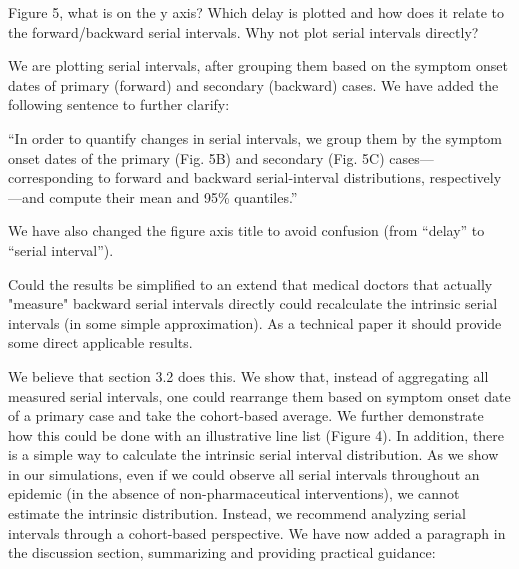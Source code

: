 \documentclass[12pt]{article}
\newcommand{\revtext}{\textsf}
\begin{document}
\revtext{Figure 5, what is on the y axis? Which delay is plotted and how does it relate to the forward/backward serial intervals. Why not plot serial intervals directly?}

We are plotting serial intervals, after grouping them based on the symptom onset dates of primary (forward) and secondary (backward) cases. We have added the following sentence to further clarify:

``In order to quantify changes in serial intervals, we group them by the symptom onset dates of the primary (Fig. 5B) and secondary (Fig. 5C) cases---corresponding to forward and backward serial-interval distributions, respectively---and compute their mean and 95\% quantiles.''

We have also changed the figure axis title to avoid confusion (from ``delay'' to ``serial interval'').

\revtext{Could the results be simplified to an extend that medical doctors that actually "measure" backward serial intervals directly could recalculate the intrinsic serial intervals (in some simple approximation). As a technical paper it should provide some direct applicable results.}

We believe that section 3.2 does this. We show that, instead of aggregating all measured serial intervals, one could rearrange them based on symptom onset date of a primary case and take the cohort-based average. We further demonstrate how this could be done with an illustrative line list (Figure 4). In addition, there is a simple way to calculate the intrinsic serial interval distribution. As we show in our simulations, even if we could observe all serial intervals throughout an epidemic (in the absence of non-pharmaceutical interventions), we cannot estimate the intrinsic distribution. Instead, we recommend analyzing serial intervals through a cohort-based perspective. We have now added a paragraph in the discussion section, summarizing and providing practical guidance:
\end{document}
